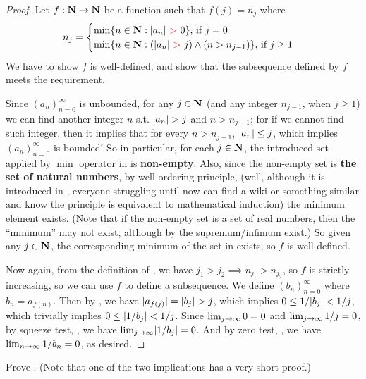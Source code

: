 \begin{proof}
Let \(f: \mathbf{N} \rightarrow \mathbf{N}\) be a function such that \(f(j) = n_j\) where
\begin{equation} \label{eq 6.2}
    n_j = 
    \begin{cases}
        \min\{n \in \SET{N} : \abs{a_n}\ \RED{>}\ 0\} \text{, if } j = 0 \\
        \min\{n \in \SET{N} : (\abs{a_n}\ \RED{>}\ j) \land (n > n_{j - 1})\} \text{, if } j \ge 1
    \end{cases}
\end{equation}
We have to show \(f\) is well-defined, and show that the subsequence defined by \(f\) meets the requirement.

Since \((a_n)_{n = 0}^{\infty}\) is unbounded, for any \(j \in \mathbf{N}\) (and any integer \(n_{j - 1}\), when \(j \ge 1\)) we can find another integer \(n\) s.t. \(\lvert a_n\rvert > j\) and \(n > n_{j - 1}\);
for if we cannot find such integer, then it implies that for every \(n > n_{j - 1}\), \(\lvert a_n\rvert \le j\), which implies \((a_n)_{n = 0}^{\infty}\) is bounded!
So in particular, for each \(j \in \mathbf{N}\), the introduced set applied by \(\min\) operator in  is \textbf{non-empty}.
Also, since the non-empty set is \textbf{the set of natural numbers}, by well-ordering-principle,
(well, although it is introduced in , everyone struggling until now can find a wiki or something similar and know the principle is equivalent to mathematical induction) the minimum element exists.
(Note that if the non-empty set is a set of real numbers, then the ``minimum'' may not exist, although by  the supremum/infimum exist.)
So given any \(j \in \mathbf{N}\), the corresponding minimum of the set in  exists, so \(f\) is well-defined.

Now again, from the definition of , we have \(j_1 > j_2 \implies n_{j_1} > n_{j_2}\), so \(f\) is strictly increasing, so we can use \(f\) to define a subsequence.
We define \((b_n)_{n = 0}^{\infty}\) where \(b_n = a_{f(n)}\).
Then by , we have \(\lvert a_{f(j)}\rvert = \lvert b_j\rvert > j\), which implies \(0 \le 1/\lvert b_j\rvert < 1/j\), which trivially implies \(0 \le \lvert1/b_j\rvert < 1/j\).
Since \(\lim_{j \to \infty} 0 = 0\) and \(\lim_{j \to \infty} 1/j = 0\), by squeeze test, , we have \(\lim_{j \to \infty} \lvert1/b_j\rvert = 0\).
And by zero test, , we have \(\lim_{n \to \infty} 1/b_n = 0\), as desired.
\end{proof}

\begin{exercise} \label{exercise 6.6.4}
Prove .
(Note that one of the two implications has a very short proof.)
\end{exercise}

